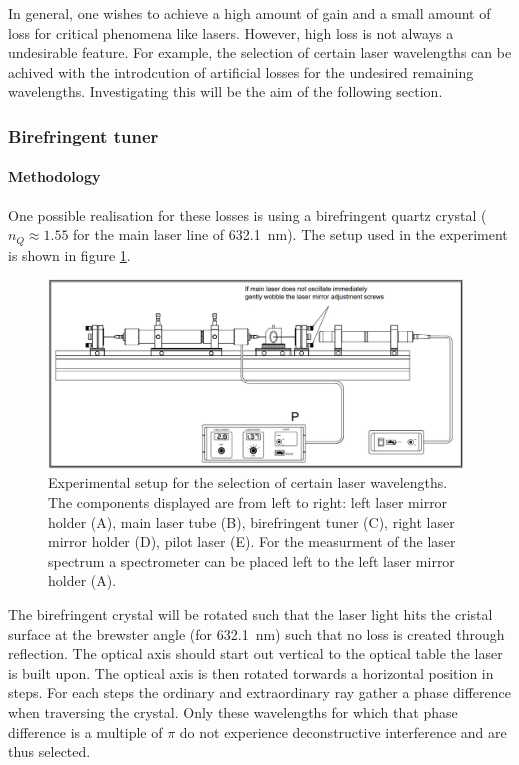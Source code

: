 \documentclass[../main.tex]{subfiles}
\begin{document}
In general, one wishes to achieve a high amount of gain and a small amount of loss for critical phenomena like lasers. However, high loss is not always a undesirable feature. For example, the selection of certain laser wavelengths can be achived with the introdcution of artificial losses for the undesired remaining wavelengths. Investigating this will be the aim of the following section.

\subsubsection{Birefringent tuner}
    \paragraph{Methodology}
        One possible realisation for these losses is using a birefringent quartz crystal ($n_Q \approx\num{1.55}$ for the main laser line of \SI{632.1}{nm}). The setup used in the experiment is shown in figure \ref{fig:5-Aufbau}.

        \begin{figure}[H]
            \centering 
            \includegraphics[width = 11cm]{Bilddateien/5/5-Aufbau.jpg}
            \caption{ Experimental setup for the selection of certain laser wavelengths. The components displayed are from left to right: left laser mirror holder (A), main laser tube (B), birefringent tuner (C), right laser mirror holder (D), pilot laser (E). For the measurment of the laser spectrum a spectrometer can be placed left to the left laser mirror holder (A).}
            \label{fig:5-Aufbau}
        \end{figure}

        \noindent The birefringent crystal will be rotated such that the laser light hits the cristal surface at the brewster angle (for \SI{632.1}{nm}) such that no loss is created through reflection. The optical axis should start out vertical to the optical table the laser is built upon. The optical axis is then rotated torwards a horizontal position in steps. For each steps the ordinary and extraordinary ray gather a phase difference when traversing the crystal. Only these wavelengths for which that phase difference is a multiple of $\pi$ do not experience deconstructive interference and are thus selected.
\end{document}

